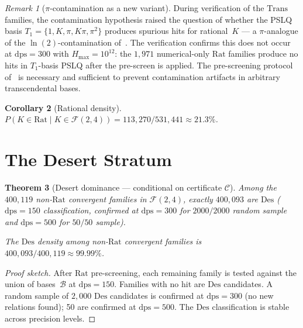 \documentclass[12pt, reqno]{amsart}
\newtheorem{theorem}{Theorem}[section]
\newtheorem{corollary}[theorem]{Corollary}
\theoremstyle{definition}
\theoremstyle{remark}
\newtheorem{remark}[theorem]{Remark}
\newcommand{\Rat}{\mathrm{Rat}}
\newcommand{\Trans}{\mathrm{Trans}}
\newcommand{\Des}{\mathrm{Des}}
\begin{document}
\begin{remark}[$\pi$-contamination as a new variant]\label{rem:picontam}
During verification of
the $\Trans$ families, the contamination hypothesis raised the question
of whether the PSLQ basis $T_1 = \{1, K, \pi, K\pi, \pi^2\}$ produces spurious
hits for rational~$K$ --- a $\pi$-analogue of the $\ln(2)$-contamination of~\cite{contamination}.
The verification confirms this does not occur at $\mathrm{dps}=300$ with $H_{\max}=10^{12}$:
the $1{,}971$ numerical-only $\Rat$ families produce no hits in $T_1$-basis PSLQ
after the pre-screen is applied. The pre-screening protocol of~\cite{contamination} is
necessary and sufficient to prevent contamination artifacts in arbitrary
transcendental bases.
\end{remark}

\begin{corollary}[Rational density]\label{cor:ratdensity}
$P(K \in \Rat \mid K \in \mathcal{F}(2,4)) = 113{,}270/531{,}441 \approx 21.3\%$.
\end{corollary}


\section{The Desert Stratum}\label{sec:desert}

\begin{theorem}[Desert dominance --- conditional on certificate $\mathcal{C}$]\label{thm:desert}
Among the $400{,}119$ non-$\Rat$
convergent families in $\mathcal{F}(2,4)$, exactly $400{,}093$ are $\Des$ ($\mathrm{dps}=150$ classification,
confirmed at $\mathrm{dps}=300$ for $2000/2000$ random sample and $\mathrm{dps}=500$ for $50/50$ sample).

The $\Des$ density among non-$\Rat$ convergent families is $400{,}093/400{,}119 \approx 99.99\%$.
\end{theorem}

\begin{proof}[Proof sketch]
After $\Rat$ pre-screening, each remaining family is tested against
the union of bases~$\mathcal{B}$ at $\mathrm{dps}=150$. Families with no hit are $\Des$ candidates.
A random sample of $2{,}000$ $\Des$ candidates is confirmed at $\mathrm{dps}=300$ (no new
relations found); 50 are confirmed at $\mathrm{dps}=500$. The $\Des$ classification is
stable across precision levels.
\end{proof}
\end{document}
